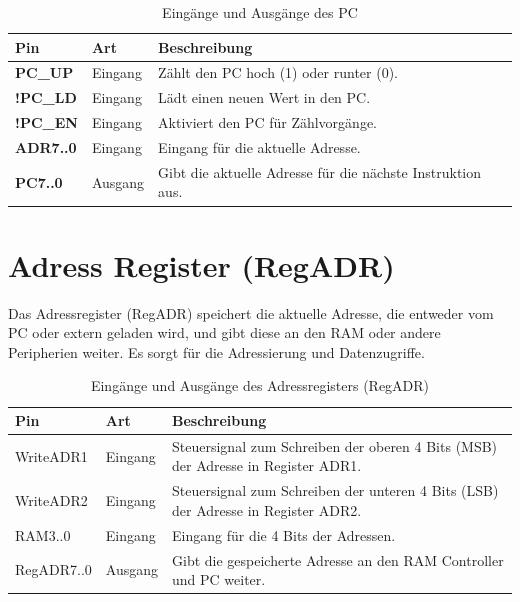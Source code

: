 \begin{table}[H]
  \centering
  \begin{tabular}{|l|l|p{8cm}|}
    \hline
    \textbf{Pin}      & \textbf{Art} & \textbf{Beschreibung}                                      \\
    \hline
    \textbf{PC\_UP}   & Eingang      & Zählt den PC hoch (1) oder runter (0).                     \\ \hline
    \textbf{!PC\_LD}  & Eingang      & Lädt einen neuen Wert in den PC.                           \\ \hline
    \textbf{!PC\_EN}  & Eingang      & Aktiviert den PC für Zählvorgänge.                         \\ \hline
    \textbf{ADR7..0 } & Eingang      & Eingang für die aktuelle Adresse.                          \\ \hline
    \textbf{PC7..0 }  & Ausgang      & Gibt die aktuelle Adresse für die nächste Instruktion aus. \\ \hline
  \end{tabular} \caption{Eingänge und Ausgänge des PC}
\end{table}



\section{Adress Register (RegADR)}
\label{sec: adress-register}

Das Adressregister (RegADR) speichert die aktuelle Adresse, die entweder vom PC oder extern geladen wird,
und gibt diese an den RAM oder andere Peripherien weiter. Es sorgt für die Adressierung und Datenzugriffe.

\begin{table}[H]
  \centering
  \begin{tabular}{|l|l|p{8cm}|} \hline
    \textbf{Pin} & \textbf{Art} & \textbf{Beschreibung}                                                             \\ \hline
    WriteADR1    & Eingang      & Steuersignal zum Schreiben der oberen 4 Bits (MSB) der Adresse in Register ADR1.  \\ \hline
    WriteADR2    & Eingang      & Steuersignal zum Schreiben der unteren 4 Bits (LSB) der Adresse in Register ADR2. \\ \hline
    RAM3..0      & Eingang      & Eingang für die 4 Bits der Adressen.                                              \\ \hline
    RegADR7..0   & Ausgang      & Gibt die gespeicherte Adresse an den RAM Controller und PC weiter.                \\ \hline
  \end{tabular}
  \caption{Eingänge und Ausgänge des Adressregisters (RegADR)}
\end{table}


